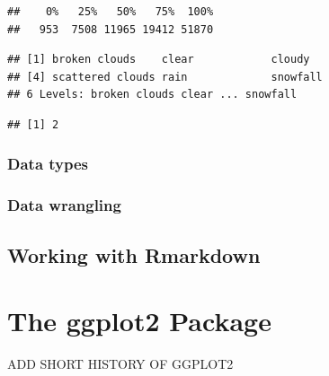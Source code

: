 \documentclass[
]{krantz}
\makeatletter
\newenvironment{Shaded}{\begin{snugshade}}{\end{snugshade}}
\newcommand{\FunctionTok}[1]{\textcolor[rgb]{0,0,0}{#1}}
\newcommand{\NormalTok}[1]{#1}
\newcommand{\SpecialCharTok}[1]{\textcolor[rgb]{0,0,0}{#1}}
\newenvironment{kframe}{%
\medskip{}
\setlength{\fboxsep}{.8em}
 \def\at@end@of@kframe{}%
 \ifinner\ifhmode%
  \def\at@end@of@kframe{\end{minipage}}%
  \begin{minipage}{\columnwidth}%
 \fi\fi%
 \def\FrameCommand##1{\hskip\@totalleftmargin \hskip-\fboxsep
 \colorbox{shadecolor}{##1}\hskip-\fboxsep
     \hskip-\linewidth \hskip-\@totalleftmargin \hskip\columnwidth}%
 \MakeFramed {\advance\hsize-\width
   \@totalleftmargin\z@ \linewidth\hsize
   \@setminipage}}%
 {\par\unskip\endMakeFramed%
 \at@end@of@kframe}
\renewenvironment{Shaded}{\begin{kframe}}{\end{kframe}}
\makeatother
\begin{document}
\begin{verbatim}
##    0%   25%   50%   75%  100% 
##   953  7508 11965 19412 51870
\end{verbatim}

\begin{Shaded}
\end{Shaded}

\begin{verbatim}
## [1] broken clouds    clear            cloudy          
## [4] scattered clouds rain             snowfall        
## 6 Levels: broken clouds clear ... snowfall
\end{verbatim}

\begin{Shaded}
\end{Shaded}

\begin{verbatim}
## [1] 2
\end{verbatim}

\hypertarget{data-types}{%
\subsection{Data types}\label{data-types}}

\hypertarget{data-wrangling}{%
\subsection{Data wrangling}\label{data-wrangling}}

\hypertarget{rmarkdown}{%
\section{Working with Rmarkdown}\label{rmarkdown}}

\hypertarget{ggplot}{%
\chapter{The ggplot2 Package}\label{ggplot}}

ADD SHORT HISTORY OF GGPLOT2
\end{document}
